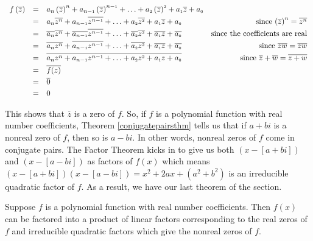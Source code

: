 \documentclass{ximera}
\begin{document}
\[ 
\begin{array}{rclr}
    f\left(\overline{z}\right) & = &  a_{n} \left(\overline{z}\right)^{n} + a_{n-\mbox{\tiny$1$}} \left(\overline{z}\right)^{n-\mbox{\tiny$1$}} + \ldots + a_{\mbox{\tiny $2$}}\left( \overline{z}\right)^{\mbox{\tiny $2$}} + a_{\mbox{\tiny $1$}} \overline{z} + a_{\mbox{\tiny $0$}} & \\ [3pt]
    &  = & a_{n}\overline{z^{n}} + a_{n-\mbox{\tiny$1$}}\overline{z^{n-\mbox{\tiny$1$}}} + \ldots + a_{\mbox{\tiny $2$}}\overline{z^{\mbox{\tiny $2$}}} + a_{\mbox{\tiny $1$}} \overline{z} + a_{\mbox{\tiny $0$}} & \mbox{ since $\left(\overline{z}\right)^n = \overline{z^{n}}$}\\ [3pt]
    & = & \overline{a_{n}}\overline{z^{n}} + \overline{a_{n-\mbox{\tiny$1$}}}\overline{z^{n-\mbox{\tiny$1$}}} + \ldots +  \overline{a_{\mbox{\tiny $2$}}}\overline{z^{\mbox{\tiny $2$}}} + \overline{a_{\mbox{\tiny $1$}}} \overline{z} + \overline{a_{\mbox{\tiny $0$}}} & \mbox{since the coefficients are real} \\ [3pt]
    & = & \overline{a_{n} z^{n}} + \overline{a_{n-\mbox{\tiny$1$}} z^{n-\mbox{\tiny$1$}}} + \ldots +  \overline{a_{\mbox{\tiny $2$}} z^{\mbox{\tiny $2$}}} + \overline{a_{\mbox{\tiny $1$}} z} + \overline{a_{\mbox{\tiny $0$}}} &  \mbox{ since $\overline{z}  \overline{w}=\overline{zw} $}\\ [3pt]
    & = & \overline{a_{n} z^{n} + a_{n-\mbox{\tiny$1$}} z^{n-\mbox{\tiny$1$}} + \ldots + a_{\mbox{\tiny $2$}} z^{\mbox{\tiny $2$}} + a_{\mbox{\tiny $1$}} z + a_{\mbox{\tiny $0$}}} & \mbox{ since $ \overline{z} + \overline{w} = \overline{z+w} $}\\ [3pt]
    & = & \overline{f(z)} & \\ [3pt]
    & = & \overline{0} & \\ [3pt]
    & = & 0 & \\
\end{array} 
\]

This shows that $\overline{z}$ is a zero of $f$.  So, if $f$ is a polynomial function with real number coefficients, Theorem \ref{conjugatepairsthm} tells us that if $a+bi$ is a nonreal zero of $f$, then so is $a-bi$.  In other words, nonreal zeros of $f$ come in conjugate pairs.  The Factor Theorem kicks in to give us both $(x-[a+bi])$ and $(x-[a-bi])$ as factors of $f(x)$ which means $(x-[a+bi])(x-[a-bi]) = x^2 + 2a x + \left(a^2+b^2\right)$ is an irreducible quadratic factor of $f$.  As a result, we have our last theorem of the section.

\begin{theorem} 
    \label{realfactorization}
    Suppose $f$ is a polynomial function with real number coefficients.  Then $f(x)$ can be factored into a product of linear factors corresponding to the real zeros of $f$ and irreducible quadratic factors which give the nonreal zeros of $f$. 
\end{theorem}
\end{document}
